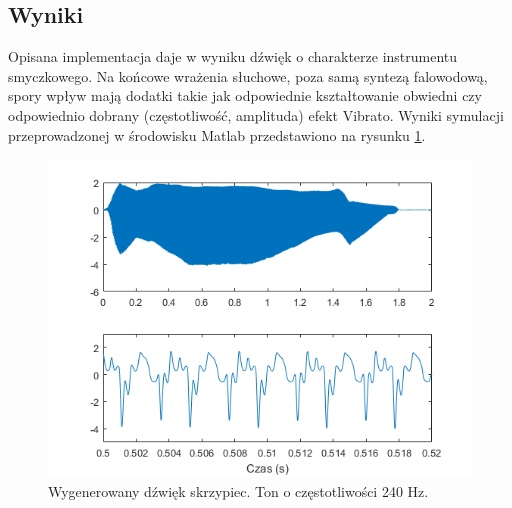 \subsection{Wyniki}
Opisana implementacja daje w wyniku dźwięk o charakterze instrumentu smyczkowego. Na końcowe wrażenia słuchowe, poza samą syntezą falowodową, spory wpływ mają dodatki takie jak odpowiednie kształtowanie obwiedni czy odpowiednio dobrany (częstotliwość, amplituda) efekt Vibrato. Wyniki symulacji przeprowadzonej w środowisku Matlab przedstawiono na rysunku \ref{rys:model_violin_matlab}.
\begin{figure}[H]
	\centering
	\includegraphics[width=12cm]{grafiki/model_violin_matlab}
	\captionsetup{justification=centering}
	\caption{Wygenerowany dźwięk skrzypiec. Ton o częstotliwości 240 Hz.}
	\label{rys:model_violin_matlab}
\end{figure}
